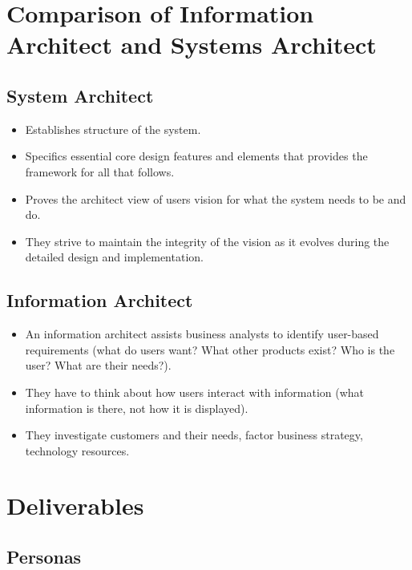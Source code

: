 \section{Comparison of Information Architect and Systems Architect}\label{sec:comparison_of_information_architect_and_systems_architect}

\subsection{System Architect}\label{sub:system_architect}

\begin{itemize}
    \item Establishes structure of the system.
    \item Specifics essential core design features and elements that provides the framework for all that follows.
    \item Proves the architect view of users vision for what the system needs to be and do.
    \item They strive to maintain the integrity of the vision as it evolves during the detailed design and implementation.
\end{itemize}

\subsection{Information Architect}\label{sub:information_architect}

\begin{itemize}
    \item An information architect assists business analysts to identify user-based requirements (what do users want? What other products exist? Who is the user? What are their needs?).
    \item They have to think about how users interact with information (what information is there, not how it is displayed).
    \item They investigate customers and their needs, factor business strategy, technology resources.
\end{itemize}

\section{Deliverables}\label{sec:deliverables}

\subsection{Personas}\label{sub:personas}

